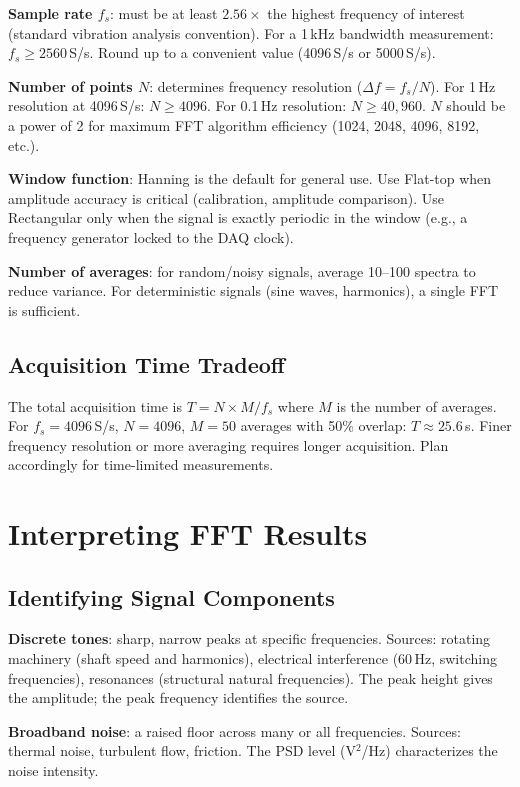 \documentclass[11pt,letterpaper,twoside,openany]{book}
\begin{document}
\textbf{Sample rate $f_s$}: must be at least $2.56\times$ the highest frequency of interest (standard vibration analysis convention). For a 1\,kHz bandwidth measurement: $f_s \geq 2560$\,S/s. Round up to a convenient value (4096\,S/s or 5000\,S/s).

\textbf{Number of points $N$}: determines frequency resolution ($\Delta f = f_s/N$). For 1\,Hz resolution at 4096\,S/s: $N \geq 4096$. For 0.1\,Hz resolution: $N \geq 40{,}960$. $N$ should be a power of 2 for maximum FFT algorithm efficiency (1024, 2048, 4096, 8192, etc.).

\textbf{Window function}: Hanning is the default for general use. Use Flat-top when amplitude accuracy is critical (calibration, amplitude comparison). Use Rectangular only when the signal is exactly periodic in the window (e.g., a frequency generator locked to the DAQ clock).

\textbf{Number of averages}: for random/noisy signals, average 10--100 spectra to reduce variance. For deterministic signals (sine waves, harmonics), a single FFT is sufficient.

\subsection{Acquisition Time Tradeoff}
The total acquisition time is $T = N \times M / f_s$ where $M$ is the number of averages. For $f_s = 4096$\,S/s, $N = 4096$, $M = 50$ averages with 50\% overlap: $T \approx 25.6$\,s. Finer frequency resolution or more averaging requires longer acquisition. Plan accordingly for time-limited measurements.

\section{Interpreting FFT Results}
\subsection{Identifying Signal Components}
\textbf{Discrete tones}: sharp, narrow peaks at specific frequencies. Sources: rotating machinery (shaft speed and harmonics), electrical interference (60\,Hz, switching frequencies), resonances (structural natural frequencies). The peak height gives the amplitude; the peak frequency identifies the source.

\textbf{Broadband noise}: a raised floor across many or all frequencies. Sources: thermal noise, turbulent flow, friction. The PSD level (V$^2$/Hz) characterizes the noise intensity.
\end{document}
